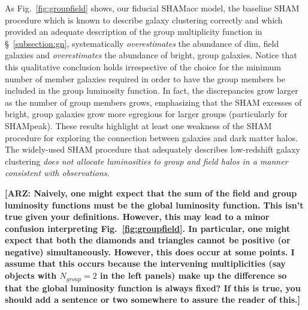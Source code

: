 \documentclass[usenatbib,usegraphicx,letterpaper]{mn2e}
\begin{document}
As Fig.~\ref{fig:groupfield} shows, our fiducial SHAMacc model, 
the baseline SHAM procedure which is known to describe galaxy clustering correctly and 
which provided an adequate description of the group multiplicity function in \S~\ref{subsection:gn}, 
systematically {\em overestimates} the abundance of dim, field galaxies and {\em overestimates} 
the abundance of bright, group galaxies.  Notice that this qualitative 
conclusion holds irrespective of the choice for the minimum number of member 
galaxies required in order to have the group members be included in the 
group luminosity function. In fact, the discrepancies grow larger as the number 
of group members grows, emphasizing that the SHAM excesses of bright, group 
galaxies grow more egregious for larger groups (particularly for SHAMpeak).  
These results highlight at least one weakness of 
the SHAM procedure for exploring the connection between galaxies and dark matter halos.  
The widely-used SHAM procedure that adequately describes 
low-redshift galaxy clustering {\em does not allocate luminosities 
to group and field halos in a manner consistent with observations}. 


{\bf [ARZ: Naively, one might expect that the sum of the field and group luminosity 
functions must be the global luminosity function.  This isn't true given your 
definitions. However, this may lead to a minor confusion interpreting Fig.~\ref{fig:groupfield}.  
In particular, one might expect that both the diamonds and triangles cannot be positive (or negative) 
simultaneously.  However, this does occur at some points.  I assume that this occurs because 
the intervening multiplicities (say objects with $N_{group}=2$ in the left panels) make up the 
difference so that the global luminosity function is always fixed? If this is true, you should 
add a sentence or two somewhere to assure the reader of this.]}
\end{document}
